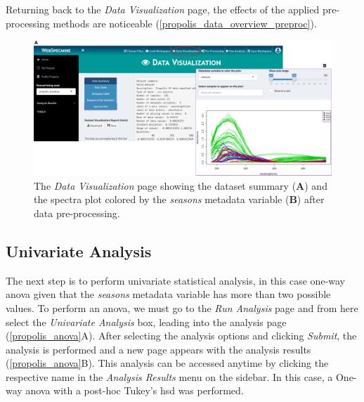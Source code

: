 Returning back to the \textit{Data Visualization} page, the effects of the applied pre-processing methods are noticeable (\autoref{propolis_data_overview_preproc}).


\begin{figure}[H]
	\centering
	\includegraphics[width=1\linewidth]{Imagens/Propolis/data_overview_preproc}
	\caption{The \textit{Data Visualization} page showing the dataset summary (\textbf{A}) and the spectra plot colored by the \textit{seasons} metadata variable (\textbf{B}) after data pre-processing.}
	\label{propolis_data_overview_preproc}
\end{figure}



\subsection{Univariate Analysis}

The next step is to perform univariate statistical analysis, in this case one-way \gls{anova} given that the \textit{seasons} metadata variable has more than two possible values.
To perform an \gls{anova}, we must go to the \textit{Run Analysis} page and from here select the \textit{Univariate Analysis} box, leading into the analysis page (\autoref{propolis_anova}A). After selecting the analysis options and clicking \textit{Submit}, the analysis is performed and a new page appears with the analysis results (\autoref{propolis_anova}B). This analysis can be accessed anytime by clicking the respective name in the \textit{Analysis Results} menu on the sidebar. In this case, a One-way \gls{anova} with a post-hoc Tukey's \gls{hsd} was performed.

